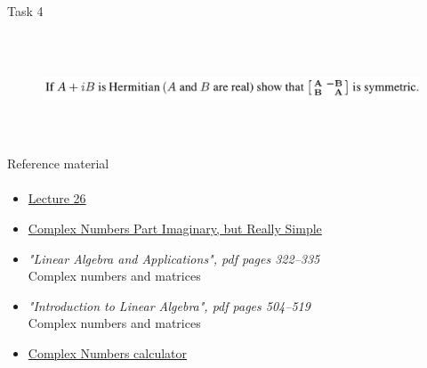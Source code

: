\documentclass[aspectratio=169]{beamer}
\newcommand{\fbckg}[1]{\usebackgroundtemplate{\texttt{[image: \#1]}}}%
\begin{document}
\begin{frame}[t]{Task 4}
    \framesubtitle{}
    \begin{figure}[H]
        \centering\includegraphics[height=3cm,width=1\textwidth,keepaspectratio]{4.png}
        \label{fig:4.png}
    \end{figure}
\end{frame}

\begin{frame}[t]{Reference material}
    \framesubtitle{}
    \Large
    \begin{itemize}
        \item \href{https://www.youtube.com/watch?v=M0Sa8fLOajA&list=PL49CF3715CB9EF31D&index=27}{Lecture 26}
        \item \href{https://youtu.be/Jkv-55ndVYY}{Complex Numbers Part Imaginary, but Really Simple}
        \item \textit{"Linear Algebra and Applications", pdf pages 322--335 }\\ Complex numbers and matrices
        \item \textit{"Introduction to Linear Algebra", pdf pages 504--519 }\\ Complex numbers and matrices
        \item \href{https://programforyou.ru/calculators/complex-calculator}{Complex Numbers calculator}
    \end{itemize}
\end{frame}

\fbckg{fibeamer/figs/last_page.png}
\frame[plain]{}
\end{document}
